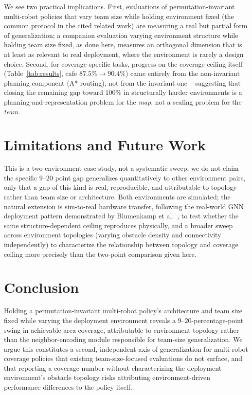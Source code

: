 \documentclass[12pt]{article}
\begin{document}
We see two practical implications. First, evaluations of permutation-invariant
multi-robot policies that vary team size while holding environment fixed (the
common protocol in the cited related work) are measuring a real but partial
form of generalization; a companion evaluation varying environment structure
while holding team size fixed, as done here, measures an orthogonal
dimension that is at least as relevant to real deployment, where the
environment is rarely a design choice. Second, for coverage-specific tasks,
progress on the coverage ceiling itself (Table~\ref{tab:results}, cafe
$87.5\%\to90.4\%$) came entirely from the non-invariant planning component
(A* routing), not from the invariant one -- suggesting that closing the
remaining gap toward $100\%$ in structurally harder environments is a
planning-and-representation problem for the \emph{map}, not a scaling
problem for the \emph{team}.

\section{Limitations and Future Work}
This is a two-environment case study, not a systematic sweep; we do not
claim the specific $9$--$20$ point gap generalizes quantitatively to other
environment pairs, only that a gap of this kind is real, reproducible, and
attributable to topology rather than team size or architecture. Both
environments are simulated; the natural extension is sim-to-real hardware
transfer, following the real-world GNN deployment pattern demonstrated by
Blumenkamp et al.~\cite{gnnrealworld2021}, to test whether the same
structure-dependent ceiling reproduces physically, and a broader sweep across
environment topologies (varying obstacle density and connectivity
independently) to characterize the relationship between topology and
coverage ceiling more precisely than the two-point comparison given here.

\section{Conclusion}
Holding a permutation-invariant multi-robot policy's architecture and team
size fixed while varying the deployment environment reveals a
$9$--$20$-percentage-point swing in achievable area coverage, attributable to
environment topology rather than the neighbor-encoding module responsible
for team-size generalization. We argue this constitutes a second,
independent axis of generalization for multi-robot coverage policies that
existing team-size-focused evaluations do not surface, and that reporting a
coverage number without characterizing the deployment environment's obstacle
topology risks attributing environment-driven performance differences to the
policy itself.
\end{document}
